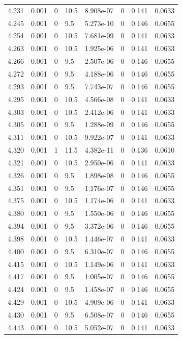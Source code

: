 \documentclass[preview]{standalone}
\begin{document}
{{{{{{{{{{{{{\begin{tabular}{L{1.2cm}C{1.2cm} C{0.3cm}C{0.5cm} C{1.4cm}C{1.4cm} C{1.4cm}C{1.4cm}}
  4.231  &  0.001  & 0     & 10.5 &  8.908e-07  & 0  & 0.141 &  0.0633   \\ 
  4.245  &  0.001  & 0     & 9.5 &  5.273e-10  & 0  & 0.146 &  0.0655   \\ 
  4.254  &  0.001  & 0     & 10.5 &  7.681e-09  & 0  & 0.141 &  0.0633   \\ 
  4.263  &  0.001  & 0     & 10.5 &  1.925e-06  & 0  & 0.141 &  0.0633   \\ 
  4.266  &  0.001  & 0     & 9.5 &  2.507e-06  & 0  & 0.146 &  0.0655   \\ 
  4.272  &  0.001  & 0     & 9.5 &  4.188e-06  & 0  & 0.146 &  0.0655   \\ 
  4.293  &  0.001  & 0     & 9.5 &  7.743e-07  & 0  & 0.146 &  0.0655   \\ 
  4.295  &  0.001  & 0     & 10.5 &  4.566e-08  & 0  & 0.141 &  0.0633   \\ 
  4.303  &  0.001  & 0     & 10.5 &  2.412e-06  & 0  & 0.141 &  0.0633   \\ 
  4.305  &  0.001  & 0     & 9.5 &  1.288e-09  & 0  & 0.146 &  0.0655   \\ 
  4.311  &  0.001  & 0     & 10.5 &  9.922e-07  & 0  & 0.141 &  0.0633   \\ 
  4.320  &  0.001  & 1     & 11.5 &  4.382e-11  & 0  & 0.136 &  0.0610   \\ 
  4.321  &  0.001  & 0     & 10.5 &  2.950e-06  & 0  & 0.141 &  0.0633   \\ 
  4.326  &  0.001  & 0     & 9.5 &  1.898e-08  & 0  & 0.146 &  0.0655   \\ 
  4.351  &  0.001  & 0     & 9.5 &  1.176e-07  & 0  & 0.146 &  0.0655   \\ 
  4.375  &  0.001  & 0     & 10.5 &  1.174e-06  & 0  & 0.141 &  0.0633   \\ 
  4.380  &  0.001  & 0     & 9.5 &  1.550e-06  & 0  & 0.146 &  0.0655   \\ 
  4.394  &  0.001  & 0     & 9.5 &  3.372e-06  & 0  & 0.146 &  0.0655   \\ 
  4.398  &  0.001  & 0     & 10.5 &  1.446e-07  & 0  & 0.141 &  0.0633   \\ 
  4.400  &  0.001  & 0     & 9.5 &  6.310e-07  & 0  & 0.146 &  0.0655   \\ 
  4.415  &  0.001  & 0     & 10.5 &  1.149e-06  & 0  & 0.141 &  0.0633   \\ 
  4.417  &  0.001  & 0     & 9.5 &  1.005e-07  & 0  & 0.146 &  0.0655   \\ 
  4.424  &  0.001  & 0     & 9.5 &  1.458e-07  & 0  & 0.146 &  0.0655   \\ 
  4.429  &  0.001  & 0     & 10.5 &  4.909e-06  & 0  & 0.141 &  0.0633   \\ 
  4.430  &  0.001  & 0     & 9.5 &  6.508e-07  & 0  & 0.146 &  0.0655   \\ 
  4.443  &  0.001  & 0     & 10.5 &  5.052e-07  & 0  & 0.141 &  0.0633   \\ 
\hline 
\end{tabular} 

}}}}}}}}}}}}}
\end{document}
